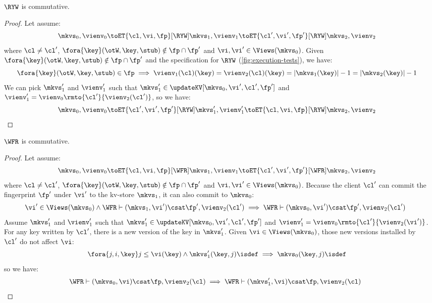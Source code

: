 \begin{lemma}
    \label{lem:ryw-comm}
    \(\RYW\) is commutative.
\end{lemma}
\begin{proof}
    Let assume:
    \[
        \mkvs_0, \vienv_0 \toET{\cl, \vi, \fp}[\RYW] \mkvs_1, \vienv_1 \toET{\cl', \vi', \fp'}[\RYW] \mkvs_2, \vienv_2 
    \]
    where \( \cl \neq \cl' \), \( \fora{ \key } (\otW, \key, \stub) \notin \fp \cap \fp' \) and \( \vi, \vi' \in \Views(\mkvs_0)\).
    Given \( \fora{ \key } (\otW, \key, \stub) \notin \fp \cap \fp' \) and the specification for \( \RYW \) (\cref{fig:execution-tests}), we have:
    \[
        \fora{\key} (\otW, \key, \stub) \in \fp \implies \vienv_1(\cl)(\key) = \vienv_2(\cl)(\key) = \lvert \mkvs_1(\key) \rvert - 1 = \lvert \mkvs_2(\key) \rvert - 1
    \]
    We can pick \( \mkvs'_1 \) and \( \vienv'_1 \) such that \( \mkvs'_1 \in \updateKV[\mkvs_0,\vi',\cl',\fp'] \) and \( \vienv'_1 = \vienv_0\rmto{\cl'}{\vienv_2(\cl')} \), so we have:
    \[
        \mkvs_0, \vienv_0 \toET{\cl', \vi', \fp'}[\RYW] \mkvs'_1, \vienv'_1 \toET{\cl, \vi, \fp}[\RYW] \mkvs_2, \vienv_2 
    \]
\end{proof}

\begin{lemma}
    \label{lem:wfr-comm}
    \(\WFR\) is commutative.
\end{lemma}
\begin{proof}
    Let assume:
    \[
        \mkvs_0, \vienv_0 \toET{\cl, \vi, \fp}[\WFR] \mkvs_1, \vienv_1 \toET{\cl', \vi', \fp'}[\WFR] \mkvs_2, \vienv_2 
    \]
    where \( \cl \neq \cl' \), \( \fora{ \key } (\otW, \key, \stub) \notin \fp \cap \fp' \) and \( \vi, \vi' \in \Views(\mkvs_0)\).
    Because the client \( \cl' \) can commit the fingerprint \( \fp' \) under \( \vi' \) to the kv-store \( \mkvs_1 \), it can also commit to \( \mkvs_0 \):
    \[
        \begin{array}{@{}l}
            \vi' \in \Views(\mkvs_0) \land \WFR \vdash (\mkvs_1, \vi') \csat \fp', \vienv_2(\cl') \implies  \WFR \vdash (\mkvs_0, \vi') \csat \fp', \vienv_2(\cl')
        \end{array}
    \]
    Assume \( \mkvs'_1 \) and \( \vienv'_1 \) such that \( \mkvs'_1 \in \updateKV[\mkvs_0,\vi',\cl',\fp'] \) and \( \vienv'_1 = \vienv_0\rmto{\cl'}{\vienv_2(\vi')} \).
    For any key written by \( \cl' \), there is a new version of the key in \( \mkvs'_1 \).
    Given \( \vi \in \Views(\mkvs_0)\), those new versions installed by \( \cl' \) do not affect \( \vi \):
    \[
        \fora{j,i, \key} j \leq \vi(\key) \land \mkvs'_1(\key, j)\isdef \implies \mkvs_0(\key, j)\isdef
    \]
    so we have:
    \[
        \begin{array}{@{}l}
            \WFR \vdash (\mkvs_0, \vi) \csat \fp, \vienv_2(\cl) \implies \WFR \vdash (\mkvs'_1, \vi) \csat \fp, \vienv_2(\cl)
        \end{array}
    \]
\end{proof}

